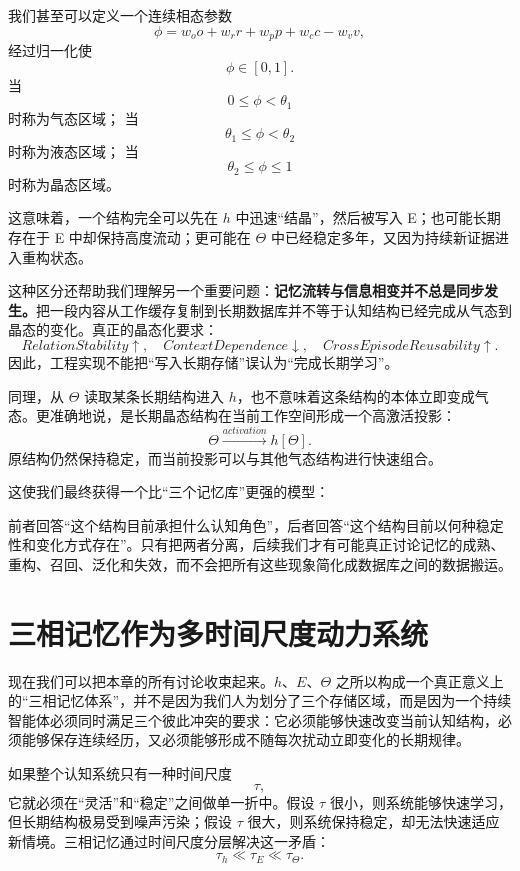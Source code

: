 我们甚至可以定义一个连续相态参数
\[
\phi
=
w_o o
+
w_r r
+
w_p p
+
w_c c
-
w_v v,
\]
经过归一化使
\[
\phi\in[0,1].
\]
当
\[
0\leq\phi<\theta_1
\]
时称为气态区域；
当
\[
\theta_1\leq\phi<\theta_2
\]
时称为液态区域；
当
\[
\theta_2\leq\phi\leq1
\]
时称为晶态区域。

这意味着，一个结构完全可以先在 $h$ 中迅速“结晶”，然后被写入 E；也可能长期存在于 E 中却保持高度流动；更可能在 $\Theta$ 中已经稳定多年，又因为持续新证据进入重构状态。

这种区分还帮助我们理解另一个重要问题：\textbf{记忆流转与信息相变并不总是同步发生。}把一段内容从工作缓存复制到长期数据库并不等于认知结构已经完成从气态到晶态的变化。真正的晶态化要求：
\[
RelationStability\uparrow,
\quad
ContextDependence\downarrow,
\quad
CrossEpisodeReusability\uparrow.
\]
因此，工程实现不能把“写入长期存储”误认为“完成长期学习”。

同理，从 $\Theta$ 读取某条长期结构进入 $h$，也不意味着这条结构的本体立即变成气态。更准确地说，是长期晶态结构在当前工作空间形成一个高激活投影：
\[
\Theta
\xrightarrow{activation}
h[\Theta].
\]
原结构仍然保持稳定，而当前投影可以与其他气态结构进行快速组合。

这使我们最终获得一个比“三个记忆库”更强的模型：

\begin{statementbox}
\centering
{}
\end{statementbox}

前者回答“这个结构目前承担什么认知角色”，后者回答“这个结构目前以何种稳定性和变化方式存在”。只有把两者分离，后续我们才有可能真正讨论记忆的成熟、重构、召回、泛化和失效，而不会把所有这些现象简化成数据库之间的数据搬运。


\section{三相记忆作为多时间尺度动力系统}

现在我们可以把本章的所有讨论收束起来。$h$、$E$、$\Theta$ 之所以构成一个真正意义上的“三相记忆体系”，并不是因为我们人为划分了三个存储区域，而是因为一个持续智能体必须同时满足三个彼此冲突的要求：它必须能够快速改变当前认知结构，必须能够保存连续经历，又必须能够形成不随每次扰动立即变化的长期规律。

如果整个认知系统只有一种时间尺度
\[
\tau,
\]
它就必须在“灵活”和“稳定”之间做单一折中。假设 $\tau$ 很小，则系统能够快速学习，但长期结构极易受到噪声污染；假设 $\tau$ 很大，则系统保持稳定，却无法快速适应新情境。三相记忆通过时间尺度分层解决这一矛盾：
\[
\boxed{
\tau_h
\ll
\tau_E
\ll
\tau_\Theta.
}
\]

